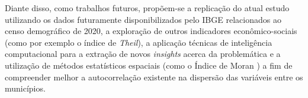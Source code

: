 Diante disso, como trabalhos futuros, propõem-se a replicação do atual estudo utilizando os dados futuramente disponibilizados pelo IBGE relacionados ao censo demográfico de 2020, a exploração de outros indicadores econômico-sociais (como por exemplo o índice de \textit{Theil}), a aplicação técnicas de inteligência computacional para a extração de novos \textit{insights} acerca da problemática e a utilização de métodos estatísticos espaciais (como o Índice de Moran \cite{cap04_ref20}) a fim de compreender melhor a autocorrelação existente na dispersão das variáveis entre os municípios.
